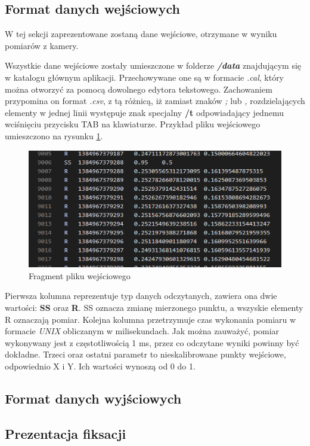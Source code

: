 \subsection{Format danych wejściowych}
W tej sekcji zaprezentowane zostaną dane wejściowe, otrzymane w wyniku pomiarów z kamery.\par
Wszystkie dane wejściowe zostały umieszczone w folderze \emph{\textbf{/data}} znajdującym się w katalogu głównym aplikacji. Przechowywane one są w formacie \emph{.cal}, który można otworzyć za pomocą dowolnego edytora tekstowego. Zachowaniem przypomina on format \emph{.csv}, z tą różnicą, iż zamiast znaków \emph{;} lub \emph{,} rozdzielających elementy w jednej linii występuje znak specjalny \textbf{/t} odpowiadający jednemu wciśnięciu przycisku TAB na klawiaturze. Przykład pliku wejściowego umieszczono na rysunku \ref{fig:plikwejsciowy}.
\begin{figure}[H]
        \centering
        \captionsetup{justification=centering,margin=2cm}
        \includegraphics[width=0.8\linewidth]{resources/plikwejsciowy.png}
        \caption{Fragment pliku wejściowego}
        \label{fig:plikwejsciowy}
\end{figure}
Pierwsza kolumna reprezentuje typ danych odczytanych, zawiera ona dwie wartości: \textbf{SS} oraz \textbf{R}. SS oznacza zmianę mierzonego punktu, a wszyskie elementy R oznaczają pomiar. Kolejna kolumna przetrzymuje czas wykonania pomiaru w formacie \emph{UNIX} obliczanym w milisekundach. Jak można zauważyć, pomiar wykonywany jest z częstotliwością 1 ms, przez co odczytane wyniki powinny być dokładne. Trzeci oraz ostatni parametr to nieskalibrowane punkty wejściowe, odpowiednio X i Y. Ich wartości wynoszą od 0 do 1.
\subsection{Format danych wyjściowych}
\blindtext
\subsection{Prezentacja fiksacji}
\blindtext
